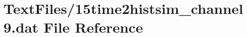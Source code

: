 \hypertarget{15time2histsim__channel9_8dat}{}\section{Text\+Files/15time2histsim\+\_\+channel9.dat File Reference}
\label{15time2histsim__channel9_8dat}
